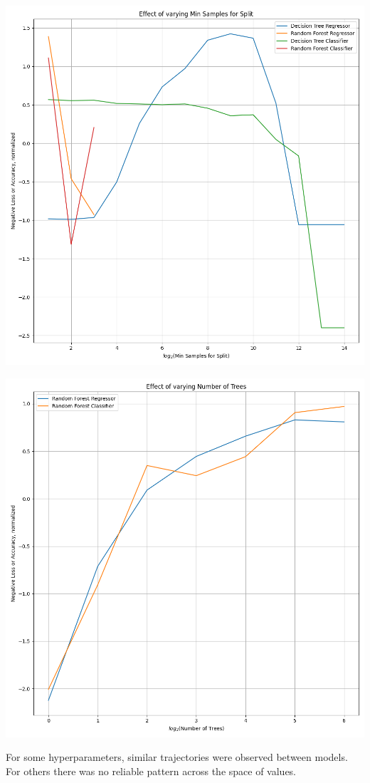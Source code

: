 \documentclass[12pt, letterpaper]{article}
\begin{document}
\includegraphics[scale=\myscale]{combo_min_samples_split.png}

\includegraphics[scale=\myscale]{combo_n_estimators.png}

For some hyperparameters, similar trajectories were observed between models. For others there was no reliable pattern across the space of values.
\end{document}
